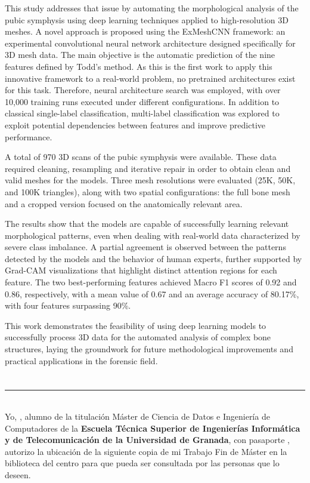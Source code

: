 This study addresses that issue by automating the morphological analysis of the pubic symphysis using deep learning techniques applied to high-resolution 3D meshes. A novel approach is proposed using the ExMeshCNN framework: an experimental convolutional neural network architecture designed specifically for 3D mesh data. The main objective is the automatic prediction of the nine features defined by Todd's method. As this is the first work to apply this innovative framework to a real-world problem, no pretrained architectures exist for this task. Therefore, neural architecture search was employed, with over 10,000 training runs executed under different configurations. In addition to classical single-label classification, multi-label classification was explored to exploit potential dependencies between features and improve predictive performance.

A total of 970 3D scans of the pubic symphysis were available. These data required cleaning, resampling and iterative repair in order to obtain clean and valid meshes for the models. Three mesh resolutions were evaluated (25K, 50K, and 100K triangles), along with two spatial configurations: the full bone mesh and a cropped version focused on the anatomically relevant area.

The results show that the models are capable of successfully learning relevant morphological patterns, even when dealing with real-world data characterized by severe class imbalance. A partial agreement is observed between the patterns detected by the models and the behavior of human experts, further supported by Grad-CAM visualizations that highlight distinct attention regions for each feature. The two best-performing features achieved Macro F1 scores of 0.92 and 0.86, respectively, with a mean value of 0.67 and an average accuracy of 80.17\%, with four features surpassing 90\%.

This work demonstrates the feasibility of using deep learning models to successfully process 3D data for the automated analysis of complex bone structures, laying the groundwork for future methodological improvements and practical applications in the forensic field.
\chapter*{}
\thispagestyle{empty}

\noindent\rule[-1ex]{\textwidth}{2pt}\\[4.5ex]

Yo, \textbf{\myName}, alumno de la titulación Máster de Ciencia de Datos e Ingeniería de Computadores de la \textbf{Escuela Técnica Superior
de Ingenierías Informática y de Telecomunicación de la Universidad de Granada}, con pasaporte \myDNI, autorizo la
ubicación de la siguiente copia de mi Trabajo Fin de Máster en la biblioteca del centro para que pueda ser
consultada por las personas que lo deseen.

